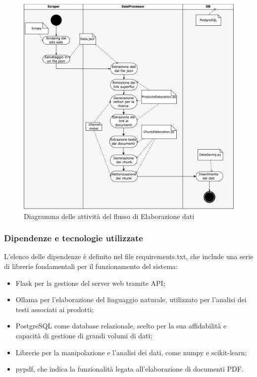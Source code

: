 \begin{figure}[H]
    \centering
    \includegraphics[width=\textwidth]{images/flussoSalvataggioDati.png}
    \caption{Diagramma delle attivit\`a del flusso di Elaborazione dati}
    \label{fig:architettura}
\end{figure}


\subsubsection{Dipendenze e tecnologie utilizzate}
L’elenco delle dipendenze è definito nel file requirements.txt, che include una serie di librerie fondamentali per il funzionamento del sistema:

\begin{itemize}
    
\item Flask per la gestione del server web tramite API;

\item Ollama per l’elaborazione del linguaggio naturale,  utilizzato per l'analisi dei testi associati ai prodotti;

\item PostgreSQL come database relazionale, scelto per la sua affidabilità e capacità di gestione di grandi volumi di dati;

\item Librerie per la manipolazione e l'analisi dei dati, come numpy e scikit-learn;

\item pypdf, che indica la funzionalità legata all'elaborazione di documenti PDF.

\end{itemize}
